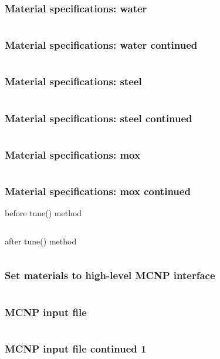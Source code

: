 \begin{frame}[fragile]
    \frametitle{Material specifications: water}
    \inputminted[frame=single,fontfamily=tt,fontsize=\scriptsize]{python}{examples/mcnp_water.py}
\end{frame}

\begin{frame}[fragile]
    \frametitle{Material specifications: water continued}
    \inputminted[frame=single,fontfamily=tt,fontsize=\scriptsize]{rst}{examples/mcnp_water.log}
\end{frame}

\begin{frame}[fragile]
    \frametitle{Material specifications: steel}
    \inputminted[frame=single,fontfamily=tt,fontsize=\scriptsize]{python}{examples/mcnp_zirc.py}
\end{frame}

\begin{frame}[fragile]
    \frametitle{Material specifications: steel continued}
    \inputminted[frame=single,fontfamily=tt,fontsize=\scriptsize]{rst}{examples/mcnp_zirc.log}
\end{frame}

\begin{frame}[fragile]
    \frametitle{Material specifications: mox}
    \inputminted[frame=single,fontfamily=tt,fontsize=\tiny]{python}{examples/mcnp_mox.py}
\end{frame}

\begin{frame}[fragile]
    \frametitle{Material specifications: mox continued}
    {\tiny before tune() method}
    \inputminted[frame=single,fontfamily=tt,fontsize=\tiny,lastline=13]{rst}{examples/mcnp_mox.log}
    {\tiny after tune() method}
    \inputminted[frame=single,fontfamily=tt,fontsize=\tiny,firstline=14]{rst}{examples/mcnp_mox.log}
\end{frame}

\begin{frame}[fragile]
    \frametitle{Set materials to high-level MCNP interface}
    \inputminted[frame=single,fontfamily=tt,fontsize=\footnotesize]{python}{examples/hmcnp2.py}
\end{frame}

\begin{frame}[fragile]
    \frametitle{MCNP input file}
    \inputminted[frame=single,fontfamily=tt,fontsize=\tiny,lastline=30]{rst}{examples/m2_0/i_}
\end{frame}

\begin{frame}[fragile]
    \frametitle{MCNP input file continued 1}
    \inputminted[frame=single,fontfamily=tt,fontsize=\tiny,firstline=30,lastline=60]{rst}{examples/m2_0/i_}
\end{frame}

